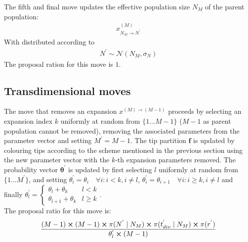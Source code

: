 \documentclass{report}
\theoremstyle{definition}
\begin{document}
The fifth and final move updates the effective population size $N_M$ of the parent population:
\begin{gather}
x^{(M)}_{N_M\to N^{'}}
\end{gather}
With distributed according to
\begin{gather}
N^{'}\sim \mathcal{N}(N_M, \sigma_N)
\end{gather}
The proposal ration for this move is $1$.
\subsection{Transdimensional moves}
The move that removes an expansion $x^{(M)\to(M-1)}$ proceeds by selecting an expansion index $k$ uniformly at random from $\{1...M-1\}$ ($M-1$ as parent population cannot be removed), removing the associated parameters from the parameter vector and setting $M^{'} = M-1$. The tip partition $\mathbf{f}$ is updated by colouring tips according to the scheme mentioned in the previous section using the new parameter vector with the $k$-th expansion parameters removed. The probability vector $\pmb\theta^{'}$ is updated by first selecting $l$ uniformly at random from $\{1...M^{'}\}$, and setting $\theta^{'}_i = \theta_i\quad \forall i:i<k,i\neq l$, $\theta^{'}_i = \theta_{i+1}\quad \forall i:i\geq k,i\neq l$ and finally $\theta^{'}_l = 
  \begin{cases} 
      \theta_l+\theta_k & l < k \\
      \theta_{l+1}+\theta_k & l \geq k
  \end{cases}$.\\
The proposal ratio for this move is:
\begin{gather}
\frac{(M-1)\cross(M-1)\cross\pi(N^{'}\mid N_{M})\cross\pi(t^{'}_{div}\mid N_{M})\cross\pi(r^{'})}{\theta^{'}_l\cross(M-1)}
\end{gather}
\end{document}
